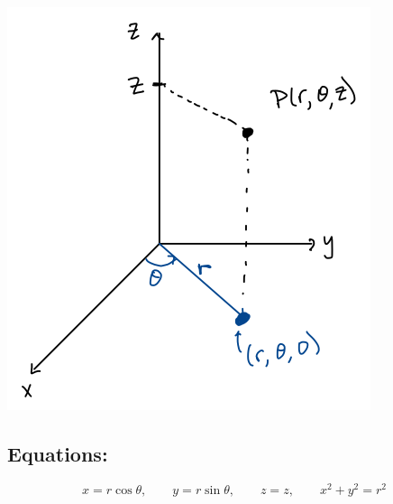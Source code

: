 



\includegraphics[width=\textwidth]{Ch12s6-Cylindrical-Coordinates.png}
\hspace*{.4in}
\subsection*{Equations:}

\[x=r\cos\theta, \qquad y=r\sin\theta, \qquad z = z, \qquad x^2+y^2=r^2\]


\vspace*{.2in}

